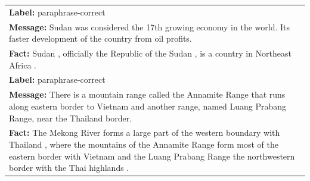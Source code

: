 \begin{table}
\begin{tabular}{p{15cm}}
        \midrule
        \textbf{Label:} paraphrase-correct                                                                                                                                                                                                                                                                                                                                                                           \\
        \textbf{Message:} Sudan was considered the 17th growing economy in the world. Its faster development of the country from oil profits.                                                                                                                                                                                                                                                                        \\
        \textbf{Fact:} Sudan , officially the Republic of the Sudan , is a country in Northeast Africa .                                                                                                                                                                                                                                                                                                             \\
        \midrule
        \textbf{Label:} paraphrase-correct                                                                                                                                                                                                                                                                                                                                                                           \\
        \textbf{Message:} There is a mountain range called the Annamite Range that runs along eastern border to Vietnam and another range, named Luang Prabang Range, near the Thailand border.                                                                                                                                                                                                                      \\
        \textbf{Fact:} The Mekong River forms a large part of the western boundary with Thailand , where the mountains of the Annamite Range form most of the eastern border with Vietnam and the Luang Prabang Range the northwestern border with the Thai highlands .                                                                                                                                              \\

\end{tabular}
\end{table}
